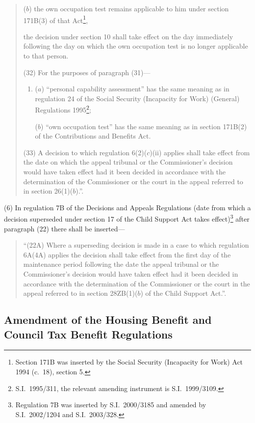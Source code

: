 \documentclass[12pt,a4paper]{article}
\begin{document}
\begin{enumerate}
\begin{quotation}
\begin{enumerate}
($b$) the own occupation test remains applicable to him under section 171B(3) of that Act\footnote{Section 171B was inserted by the Social Security (Incapacity for Work) Act 1994 (c.\ 18), section 5.},
\end{enumerate}
the decision under section 10 shall take effect on the day immediately following the day on which the own occupation test is no longer applicable to that person.

(32) For the purposes of paragraph (31)—
\begin{enumerate}\item[]
($a$) “personal capability assessment” has the same meaning as in regulation 24 of the Social Security (Incapacity for Work) (General) Regulations 1995\footnote{S.I.\ 1995/311, the relevant amending instrument is S.I.\ 1999/3109.};

($b$) “own occupation test” has the same meaning as in section 171B(2) of the Contributions and Benefits Act.
\end{enumerate}

(33) A decision to which regulation 6(2)($c$)(ii)  applies shall take effect from the date on which the appeal tribunal or the Commissioner’s decision would have taken effect had it been decided in accordance with the determination of the Commissioner or the court in the appeal referred to in section 26(1)($b$).”.
\end{quotation}
\end{enumerate}

(6) In regulation 7B of the Decisions and Appeals Regulations (date from which a decision superseded under section 17 of the Child Support Act takes effect)\footnote{Regulation 7B was inserted by S.I.\ 2000/3185 and amended by S.I.\ 2002/1204 and S.I.\ 2003/328.} after paragraph (22) there shall be inserted—
\begin{quotation}
“(22A) Where a superseding decision is made in a case to which regulation 6A(4A) applies the decision shall take effect from the first day of the maintenance period following the date the appeal tribunal or the Commissioner’s decision would have taken effect had it been decided in accordance with the determination of the Commissioner or the court in the appeal referred to in section 28ZB(1)($b$)  of the Child Support Act.”.
\end{quotation}

\subsection[4. Amendment of the Housing Benefit and Council Tax Benefit Regulations]{Amendment of the Housing Benefit and Council Tax Benefit Regulations}
\end{document}
